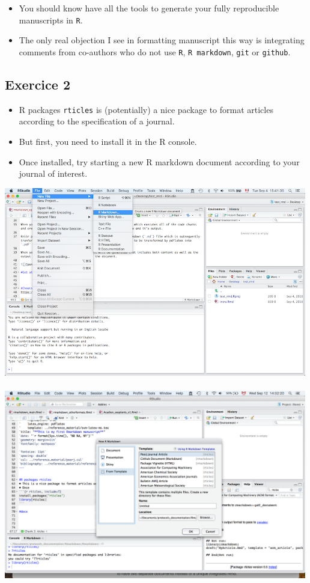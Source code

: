 \documentclass[]{article}
\begin{document}
\begin{itemize}
\item
  You should know have all the tools to generate your fully reproducible
  manuscripts in \texttt{R}.
\item
  The only real objection I see in formatting manuscript this way is
  integrating comments from co-authors who do not use \texttt{R},
  \texttt{R\ markdown}, \texttt{git} or \texttt{github}.
\end{itemize}

\hypertarget{exercice-2}{%
\subsection{Exercice 2}\label{exercice-2}}

\begin{itemize}
\item
  R packages \texttt{rticles} is (potentially) a nice package to format
  articles according to the specification of a journal.
\item
  But first, you need to install it in the R console.
\item
  Once installed, try starting a new R markdown document according to
  your journal of interest.
\end{itemize}

\includegraphics[width=5.20833in,height=\textheight]{../figures/getstarted.png}\\
\hspace*{0.333em}\\
\includegraphics[width=5.20833in,height=\textheight]{../figures/from_template.png}\\
\hspace*{0.333em}
\end{document}
